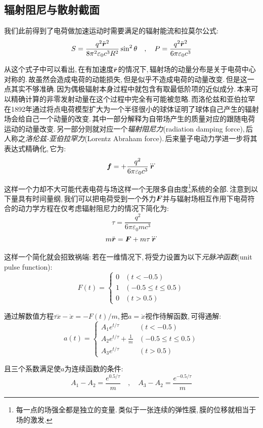 \subsection{辐射阻尼与散射截面}

我们此前得到了电荷做加速运动时需要满足的辐射能流和拉莫尔公式:
\[S=\frac{q^2\ddot{\boldsymbol{r}}^2}{8\pi^2\varepsilon_0c^3 R^2}\sin^2\theta\quad ,\quad P=\frac{q^2\ddot{\boldsymbol{r}}^2}{6\pi\varepsilon_0c^3}\]

从这个式子中可以看出,\,在有加速度$\ddot{\boldsymbol{r}}$的情况下,\,辐射场的动量分布是关于电荷中心对称的.\,故虽然会造成电荷的动能损失,\,但是似乎不造成电荷的动量改变.\,但是这一点其实不够准确.\,因为偶极辐射本身过程中就包含有取最低阶项的近似成分.\,本来可以精确计算的非零发射动量在这个过程中完全有可能被忽略.\,而洛伦兹和亚伯拉罕在1892年通过将点电荷模型扩大为一个半径很小的球体证明了球体自己产生的辐射场会给自己一个动量的改变.\,其中一部分解释为自带场产生的质量对应的跟随电荷运动的动量改变.\,另一部分则就对应一个\emph{辐射阻尼力}(radiation damping force),\,后人称之\emph{洛伦兹-亚伯拉罕力}(Lorentz Abraham force).\,后来量子电动力学进一步将其表达式精确化,\,它为:
\[\boldsymbol{f}=+\frac{q^2}{6\pi\varepsilon_0c^3}\dddot{\boldsymbol{r}}\]

这样一个力却不大可能代表电荷与场这样一个无限多自由度\footnote{每一点的场强全都是独立的变量.\,类似于一张连续的弹性膜,\,膜的位移就相当于场的激发.}系统的全部.\,注意到以下量具有时间量纲,\,我们可以把电荷受到一个外力$\boldsymbol{F}$并与辐射场相互作用下电荷符合的动力学方程在仅考虑辐射阻尼力的情况下简化为:
\[\tau=\frac{q^2}{6\pi\varepsilon_0 mc^3}\]
\[m\ddot{\boldsymbol{r}}=\boldsymbol{F}+m\tau \dddot{\boldsymbol{r}}\]

这样一个简化就会招致祸端:\,若在一维情况下,\,将受力设置为以下\emph{元脉冲函数}(unit pulse function):
\[F(t)=\begin{cases}
0&(t<-0.5)\\
1&(-0.5\leq t\leq 0.5)\\
0&(t>0.5)
\end{cases}\]

通过解数值方程$\tau \dddot{x}-\ddot{x}=-F(t)/m$,\,把$a=\ddot{x}$视作待解函数,\,可得通解:
\[a(t)=\begin{cases}
A_1e^{t/\tau}&(t<-0.5)\\
A_2e^{t/\tau}+\frac{1}{m}&(-0.5\leq t\leq 0.5)\\
A_3e^{t/\tau}&(t>0.5)
\end{cases}\]

且三个系数满足使$a$为连续函数的条件:
\[A_1-A_2=\frac{e^{0.5/\tau}}{m}\quad ,\quad A_3-A_2=\frac{e^{-0.5/\tau}}{m}\]

